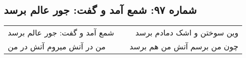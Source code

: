 \begin{center}
\section*{شماره ۹۷: شمع آمد و گفت: جور عالم برسد}
\label{sec:097}
\begin{longtable}{l p{0.5cm} r}
شمع آمد و گفت: جور عالم برسد
&&
وین سوختن و اشک دمادم برسد
\\
من در آتش میروم آتش در من
&&
چون من برسم آتش من هم برسد
\\
\end{longtable}
\end{center}
